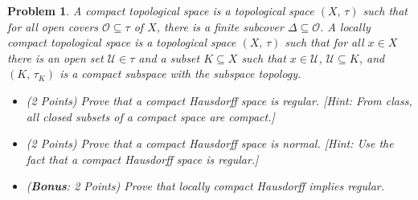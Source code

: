 \documentclass{article}
\theoremstyle{normal}
\newtheorem{problem}{Problem}
\begin{document}
    \color{black}
    \clearpage
    \color{blue}
    \begin{problem}
        A compact topological space is a topological space
        $(X,\,\tau)$ such that for all open covers $\mathcal{O}\subseteq\tau$
        of $X$, there is a finite subcover $\Delta\subseteq\mathcal{O}$. A
        locally compact topological space is a topological space
        $(X,\,\tau)$ such that for all $x\in{X}$ there is an open set
        $\mathcal{U}\in\tau$ and a subset $K\subseteq{X}$ such that
        $x\in\mathcal{U}$, $\mathcal{U}\subseteq{K}$, and
        $(K,\,\tau_{K})$ is a compact subspace with the subspace topology.
        \begin{itemize}
            \item (2 Points)
                Prove that a compact Hausdorff space is regular.
                [Hint: From class, all closed subsets of a compact space are
                compact.]
            \item (2 Points)
                Prove that a compact Hausdorff space is normal.
                [Hint: Use the fact that a compact Hausdorff space is regular.]
            \item (\textbf{Bonus}: 2 Points) Prove that locally compact
                Hausdorff implies regular.
        \end{itemize}
    \end{problem}
    \color{black}
\end{document}
